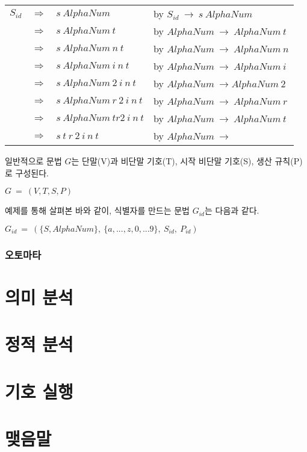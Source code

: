 \documentclass[a4paper]{book}
\begin{document}
\begin{center}
  \begin{tabular}{r c l l }
    $S_{id}$
      & $\Rightarrow$ & $s \ AlphaNum$  & by $S_{id} \ \rightarrow \ s \ AlphaNum$ \\
      & $\Rightarrow$ & $s \ AlphaNum \ t$ & by $AlphaNum \ \rightarrow \ AlphaNum \ t$ \\
      & $\Rightarrow$ & $s \ AlphaNum \ n \ t$ & by $AlphaNum \ \rightarrow \ AlphaNum \ n$ \\
      & $\Rightarrow$ & $s \ AlphaNum \ i \ n \ t$ & by $AlphaNum \ \rightarrow \ AlphaNum \ i$ \\
      & $\Rightarrow$ & $s \ AlphaNum \ 2 \ i \ n \ t$ & by $AlphaNum \ \rightarrow AlphaNum \ 2$ \\
      & $\Rightarrow$ & $s \ AlphaNum \ r \ 2 \ i \ n \ t$ & by $AlphaNum \ \rightarrow \ AlphaNum \ r$ \\
      & $\Rightarrow$ & $s \ AlphaNum \ t r 2 \ i \ n \ t$ & by $AlphaNum \ \rightarrow \ AlphaNum \ t$ \\
      & $\Rightarrow$ & $s \ t \ r \ 2 \ i \ n \ t$ & by $AlphaNum \ \rightarrow \ $ 
  \end{tabular}
\end{center}

일반적으로 문법 $G$는 단말(V)과 비단말 기호(T), 시작 비단말 기호(S),
생산 규칙(P)로 구성된다.

\begin{center}
  $ G \ = \ (V, T, S, P) $
\end{center}

예제를 통해 살펴본 바와 같이, 식별자를 만드는 문법 $G_{id}$는 다음과 같다.

\begin{center}
  $ G_{id} \ = \ (\{S, AlphaNum\}, \ \{a,...,z,0,...9 \}, \ S_{id}, \ P_{id}) $
\end{center}


\subsection{오토마타}




\chapter{의미 분석}

\chapter{정적 분석}

\chapter{기호 실행}

\chapter{맺음말}
\end{document}
